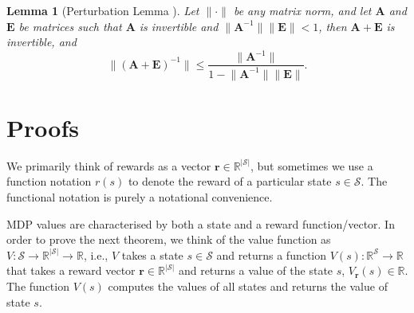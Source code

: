 \documentclass{article}
\newtheorem{lemma}[theorem]{Lemma}
\theoremstyle{definition}
\theoremstyle{remark}
\newcommand{\V}{V_{\mathbf{r}}}
\begin{document}
\begin{lemma}[Perturbation Lemma
  \cite{layton2014numerical}] \label{prop:condition_number}
  Let $\lVert \cdot \rVert$ be any matrix norm, and let $\mathbf{A}$ and
  $\mathbf{E}$ be matrices such that $\mathbf{A}$ is invertible and $\lVert
  \mathbf{A}^{-1} \rVert \lVert \mathbf{E} \rVert < 1$, then $\mathbf{A} +
  \mathbf{E}$ is invertible, and
  \[
    \lVert (\mathbf{A} + \mathbf{E})^{-1} \rVert \le \frac{\lVert
      \mathbf{A}^{-1} \rVert}{1 - \lVert \mathbf{A}^{-1} \rVert \lVert
      \mathbf{E} \rVert}.
  \]
\end{lemma}

\section{Proofs}

We primarily think of rewards as a vector $\mathbf{r} \in
\mathbb{R}^{|\mathcal{S}|}$, but sometimes we use a function notation $r(s)$ to
denote the reward of a particular state $s \in \mathcal{S}$. The functional
notation is purely a notational convenience.

MDP values are characterised by both a state and a reward function/vector. In
order to prove the next theorem, we think of the value function as $V :
\mathcal{S} \to \mathbb{R}^{|\mathcal{S}|} \to \mathbb{R}$, i.e., $V$ takes a
state $s \in \mathcal{S}$ and returns a function $V(s) :
\mathbb{R}^{\mathcal{S}} \to \mathbb{R}$ that takes a reward vector $\mathbf{r}
\in \mathbb{R}^{|\mathcal{S}|}$ and returns a value of the state $s$,
$\V(s) \in \mathbb{R}$. The function $V(s)$ computes the values of
all states and returns the value of state $s$.
\end{document}
